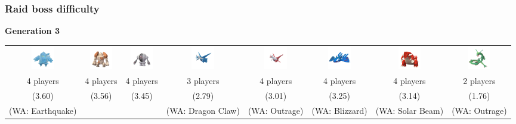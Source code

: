 \documentclass[8pt,aspectratio=169,compress]{beamer}
\begin{document}
\begin{frame}
\begin{tiny}
\frametitle{Raid boss difficulty}

\begin{block}{}
\textbf{Generation 3}

\begin{center}
\begin{tabular}{cccccccc}
\includegraphics[width=1cm]{../../images/pokemon/Regice} & 
\includegraphics[width=1cm]{../../images/pokemon/Regirock} & 
\includegraphics[width=1cm]{../../images/pokemon/Registeel} & 
\includegraphics[width=1cm]{../../images/pokemon/Latios} &
\includegraphics[width=1cm]{../../images/pokemon/Latias} &
\includegraphics[width=1cm]{../../images/pokemon/Kyogre} &
\includegraphics[width=1cm]{../../images/pokemon/Groudon} &
\includegraphics[width=1cm]{../../images/pokemon/Rayquaza}  \\
4 players & 4 players & 4 players & 3 players & 4 players & 4 players & 4 players & 2 players \\
(3.60) & (3.56) & (3.45) & (2.79) & (3.01) & (3.25) & (3.14) & (1.76) \\
(WA: Earthquake) & & & (WA: Dragon Claw) & (WA: Outrage) & (WA: Blizzard) & (WA: Solar Beam) & (WA: Outrage) \\
\end{tabular}
\end{center}


\end{block}
\end{tiny}
\end{frame}
\end{document}
